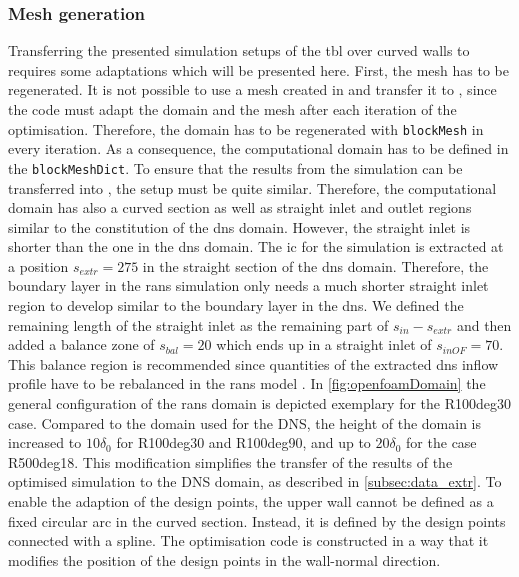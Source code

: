 \subsubsection{Mesh generation}
Transferring the presented simulation setups of the \acrshort{tbl} over curved walls to  requires some adaptations which will be presented here. 
First, the mesh has to be regenerated. 
It is not possible to use a mesh created in  and transfer it to , since the code must adapt the domain and the mesh after each iteration of the optimisation.
Therefore, the domain has to be regenerated with \verb|blockMesh| in every iteration.
As a consequence, the computational domain has to be defined in the \verb|blockMeshDict|.
To ensure that the results from the  simulation can be transferred into , the setup must be quite similar.
Therefore, the computational domain has also a curved section as well as straight inlet and outlet regions similar to the constitution of the \acrshort{dns} domain.
However, the straight inlet is shorter than the one in the \acrshort{dns} domain.
The \acrshort{ic} for the  simulation is extracted at a position $s_{extr} = 275$ in the straight section of the \acrshort{dns} domain.
Therefore, the boundary layer in the \acrshort{rans} simulation only needs a much shorter straight inlet region to develop similar to the boundary layer in the \acrshort{dns}.
We defined the remaining length of the straight inlet as the remaining part of $s_{in} - s_{extr}$ and then added a balance zone of $s_{bal} = 20$ which ends up in a straight inlet of $s_{inOF} = 70$.
This balance region is recommended since quantities of the extracted \acrshort{dns} inflow profile have to be rebalanced in the \acrshort{rans} model \citep{morita_applying_2022}.
In \autoref{fig:openfoamDomain} the general configuration of the \acrshort{rans} domain is depicted exemplary for the R100deg30 case.
Compared to the domain used for the DNS, the height of the domain is increased to $10\delta_{0}$ for R100deg30 and R100deg90, and up to $20\delta_{0}$ for the case R500deg18.
This modification simplifies the transfer of the results of the optimised  simulation to the DNS domain, as described in \autoref{subsec:data_extr}.
To enable the adaption of the design points, the upper wall cannot be defined as a fixed circular arc in the curved section.
Instead, it is defined by the design points connected with a spline.
The optimisation code is constructed in a way that it modifies the position of the design points in the wall-normal direction. 


